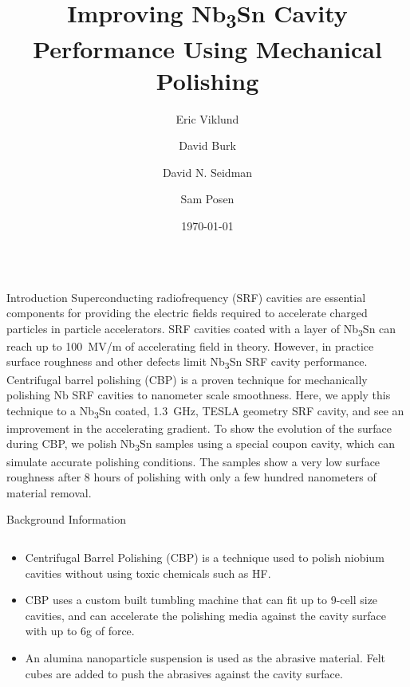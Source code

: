 \documentclass{beamer}
\title{Improving Nb\textsubscript{3}Sn Cavity Performance Using Mechanical Polishing}%
\author[shortname]{\large Eric Viklund \inst{1, 2} \and David Burk \inst{2} \and David N. Seidman \inst{1} \and Sam Posen \inst{2}}
\institute[shortinst]{\large \inst{1} Department of Materials Science and Engineering, Northwestern University \newline \inst{2} Fermi National Accelerator Laboratory}
\date{\today}%
\begin{document}
%
    \begin{frame}{}
        \maketitle
        \begin{columns}[t]
            \begin{column}{0.32\linewidth}
                \begin{block}{\label{sec:introduction}Introduction}
                    Superconducting radiofrequency (SRF) cavities are essential components for providing the electric fields required to accelerate charged particles in particle accelerators. SRF cavities coated with a layer of Nb\textsubscript{3}Sn can reach up to 100~MV/m of accelerating field in theory. However, in practice surface roughness and other defects limit Nb\textsubscript{3}Sn SRF cavity performance. Centrifugal barrel polishing (CBP) is a proven technique for mechanically polishing Nb SRF cavities to nanometer scale smoothness. Here, we apply this technique to a Nb\textsubscript{3}Sn coated, 1.3~GHz, TESLA geometry SRF cavity, and see an improvement in the accelerating gradient. To show the evolution of the surface during CBP, we polish Nb\textsubscript{3}Sn samples using a special coupon cavity, which can simulate accurate polishing conditions. The samples show a very low surface roughness after 8 hours of polishing with only a few hundred nanometers of material removal.
                \end{block}
                \begin{block}{\label{sec:backgroundinformation}Background Information}
                    \begin{columns}[t]
                        \begin{column}{0.45\columnwidth}
                            \begin{itemize}
                                \item Centrifugal Barrel Polishing (CBP) is a technique used to polish niobium cavities without using toxic chemicals such as HF.
                                \item CBP uses a custom built tumbling machine that can fit up to 9-cell size cavities, and can accelerate the polishing media against the cavity surface with up to 6g of force.
                                \item An alumina nanoparticle suspension is used as the abrasive material. Felt cubes are added to push the abrasives against the cavity surface.

\end{itemize}
\end{column}
\end{columns}
\end{block}
\end{column}
\end{columns}
\end{frame}
\end{document}
